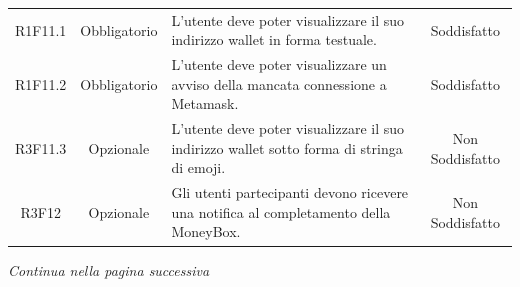\begin{table}[H]
\begin{tabular}{c | c | p{6cm} | c}
        R1F11.1                                                           & Obbligatorio & L'utente deve poter visualizzare il suo indirizzo wallet\glo{} in forma testuale.                                & Soddisfatto                    \\
        R1F11.2                                                           & Obbligatorio & L'utente deve poter visualizzare un avviso della mancata connessione a Metamask\glo{}.                     & Soddisfatto                    \\
        R3F11.3                                                           & Opzionale    & L'utente deve poter visualizzare il suo indirizzo wallet\glo{} sotto forma di stringa di emoji.                  & Non Soddisfatto                    \\
        R3F12                                                             & Opzionale    & Gli utenti partecipanti devono ricevere una notifica al completamento della MoneyBox\glo{}.                & Non Soddisfatto \\
    \end{tabular}
\end{table}
\begin{center}
    \textit{\small Continua nella pagina successiva}
\end{center}
